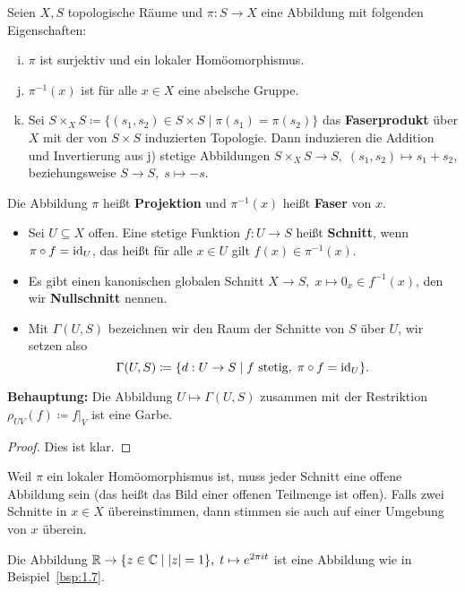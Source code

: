 \begin{bsp}
\label{bsp:1.7}
	Seien $X,S$ topologische Räume und $\pi:S\to X$ eine Abbildung mit folgenden Eigenschaften:
	\begin{enumerate}[a)]
		\setcounter{enumi}{8}
		\item $\pi$ ist surjektiv und ein lokaler Homöomorphismus.
		\item $\pi^{-1}(x)$ ist für alle $x\in X$ eine abelsche Gruppe.
		\item Sei $S\times_X S\coloneqq \{(s_1,s_2) \in S \times S \mid \pi(s_1)=\pi(s_2)\}$ das \textbf{Faserprodukt} über $X$ mit der von $S \times S$ induzierten Topologie. Dann induzieren die Addition und Invertierung aus j) stetige Abbildungen $S\times_X S \to S,\; (s_1,s_2) \mapsto s_1+s_2$, beziehungsweise $S \to S,\; s \mapsto -s$.
	\end{enumerate}
	Die Abbildung $\pi$ heißt \textbf{Projektion} und $\pi^{-1}(x)$ heißt \textbf{Faser} von $x$.
	\begin{itemize}
		\item Sei $U \subseteq X$ offen. Eine stetige Funktion $f:U \to S$ heißt \textbf{Schnitt}, wenn $\pi \circ f = \operatorname{id}_U$, das heißt für alle $x \in U$ gilt $f(x) \in \pi^{-1}(x)$.
		\item Es gibt einen kanonischen globalen Schnitt $X \to S, \; x \mapsto 0_x \in f^{-1}(x)$, den wir \textbf{Nullschnitt} nennen.
		\item Mit $\Gamma(U,S)$ bezeichnen wir den Raum der Schnitte von $S$ über $U$, wir setzen also
		\[
			\Gamma(U,S) \coloneqq \{d:U\to S \mid f \text{ stetig},\; \pi\circ f = \operatorname{id}_U\}.
		\]
	\end{itemize}
	\textbf{Behauptung:} Die Abbildung $U \mapsto \Gamma(U,S)$ zusammen mit der Restriktion $\rho_{UV}(f) \coloneqq f\vert_V$ ist eine Garbe.
	\begin{proof}
		Dies ist klar.
	\end{proof}
\end{bsp}

\begin{bem}
	Weil $\pi$ ein lokaler Homöomorphismus ist, muss jeder Schnitt eine offene Abbildung sein (das heißt das Bild einer offenen Teilmenge ist offen). Falls zwei Schnitte in $x \in X$ übereinstimmen, dann stimmen sie auch auf einer Umgebung von $x$ überein.
\end{bem}

\begin{bsp}
	Die Abbildung $\mathbb {R} \to \{z\in \mathbb {C} \mid \left \lvert z \right \rvert = 1\},\; t \mapsto e^{2 \pi i t}$ ist eine Abbildung wie in Beispiel~\ref{bsp:1.7}.
\end{bsp}

